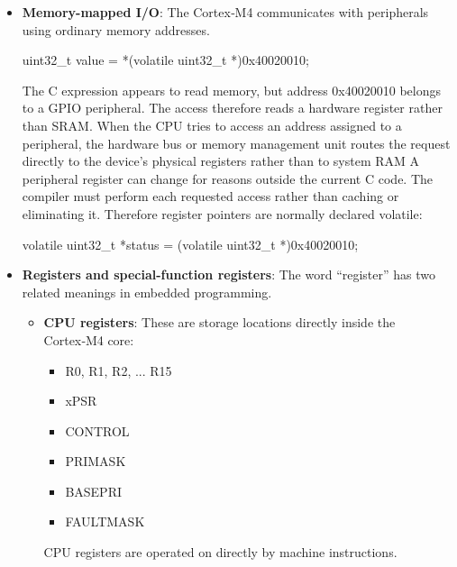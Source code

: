 \documentclass{report}
\begin{document}
\begin{itemize}
\begin{itemize}
            \end{itemize}
            A peripheral normally contains configuration registers, status registers and data registers.
        \item \textbf{Memory-mapped I/O}: The Cortex‑M4 communicates with peripherals using ordinary memory addresses.
            \bigbreak \noindent 
            \begin{ccode}
            uint32_t value = *(volatile uint32_t *)0x40020010;
            \end{ccode}
            \bigbreak \noindent 
            The C expression appears to read memory, but address 0x40020010 belongs to a GPIO peripheral. The access therefore reads a hardware register rather than SRAM.
            \bigbreak \noindent 
            When the CPU tries to access an address assigned to a peripheral, the hardware bus or memory management unit routes the request directly to the device's physical registers rather than to system RAM
            \bigbreak \noindent 
            A peripheral register can change for reasons outside the current C code. The compiler must perform each requested access rather than caching or eliminating it. Therefore register pointers are normally declared volatile:
            \bigbreak \noindent 
            \begin{ccode}
                volatile uint32_t *status =
                    (volatile uint32_t *)0x40020010;
            \end{ccode}
        \item \textbf{Registers and special-function registers}: The word “register” has two related meanings in embedded programming.
            \begin{itemize}
                \item \textbf{CPU registers}: These are storage locations directly inside the Cortex‑M4 core:
                    \begin{itemize}
                        \item R0, R1, R2, ... R15
                        \item xPSR
                        \item CONTROL
                        \item PRIMASK
                        \item BASEPRI
                        \item FAULTMASK
                    \end{itemize}
                    CPU registers are operated on directly by machine instructions.

\end{itemize}
\end{itemize}
\end{document}
